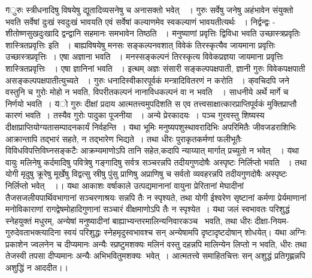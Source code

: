 {{{{\fontsize{14}{16}\selectfont \v    गुरुः स्त्रीधनादिषु विषयेषु द्यूतादिव्यसनेषु च अनासक्तो भवेत्~~।  गुरुः सर्वेषु जनेषु अहंभावेन संयुक्तो भवति सर्वेषां दुःखं स्वदुःखं भावयति एवं सर्वेषां कल्याणमेव स्वकल्याणं भावयतीत्यर्थः ~। निर्द्वन्द्वः - शीतोष्णसुखदुःखादि द्वन्द्वानि सहमानः समभावेन तिष्ठति ~।}
  {\fontsize{14}{16}\selectfont \v  मनुष्याणां प्रवृत्तिः द्विविधा भवति उच्छास्त्रप्रवृतिः शास्त्रितप्रवृत्तिः इति ~। बाह्यविषयेषु  मनसः सङ्कल्पनवशात्  विवेकं  तिरस्कृत्यैव जायमाना प्रवृत्तिः उच्छास्त्रप्रवृत्तिः~। एषा अज्ञाना भवति ~।   मनस्सङ्कल्पनं तिरस्कृत्य विवेकप्रज्ञया जायमाना प्रवृत्तिः शास्त्रितप्रवृत्तिः ~। एषा ज्ञानिनां भवति ~। इत्थम् अज्ञः संसारी सङ्कल्पपक्षपाती, ज्ञानी गुरुः विवेकपक्षपाती असङ्कल्पपक्षपातीत्युच्यते ~। गुरुः धनादिस्वीकारपूर्वकं मन्त्रादिवितरणं न करोति ~।}
{\fontsize{14}{16}\selectfont \v    क्वचिदपि जने वस्तुनि च गुरोः मोहो न भवति, विपरीतकल्पनं नानाविधकल्पनं वा न भवति~~। साधनीये अर्थे मार्गे च निर्णयो भवति~।}
{\fontsize{14}{16}\selectfont \v  यो गुरुः दीक्षां प्रदाय आत्मतत्त्वमुपदिशति स एव तत्त्वसाक्षात्कारप्राप्तिपूर्वकं मुक्तिप्राप्तौ कारणं भवति~। तस्यैव गुरोः पादुका पूजनीया ~। अन्ये प्रेरकादयः~। पञ्च गुरवस्तु शिष्यस्य दीक्षाप्राप्तियोग्यतासम्पादनकार्यं  निर्वहन्ति~। }  
{\fontsize{14}{16}\selectfont \v  यथा भूमिः मनुष्यपशुस्थावरादिभिः अपरिमितैः जीवजडराशिभिः आक्रान्तापि तद्भारं सहते, न तद्भारेण भिद्यते~। तथा धीरः पुराकृतकर्मणां फलीभूतैः विविधविपत्तिविघ्नसङ्कटैः आक्रम्यमाणोऽपि तानि सहेत,कदापि न्याय्यात् मार्गात् प्रच्युतो न भवेत्~~। }
{\fontsize{14}{16}\selectfont \v  यथा वायुः मलिनेषु कर्दमादिषु पवित्रेषु गङ्गादिषु सर्वत्र  सञ्चरन्नपि तदीयगुणदोषैः अस्पृष्टः निर्लिप्तो भवति ~। तथा योगी मृदुषु क्रूरेषु मूर्खेषु विद्वत्सु स्रीषु पुंसु प्राणिषु अप्राणिषु च  सर्वतो व्यवहरन्नपि तदीयगुणदोषैः अस्पृष्टः निर्लिप्तो भवेत्~~।।}
{\fontsize{14}{16}\selectfont \v  यथा आकाशः वर्षाकाले उत्पद्यमानानां वायुना प्रेरितानां मेघादीनां तैजसजलीयपार्थिवभागानां सञ्चरणाश्रयः सन्नपि तैः न स्पृश्यते, तथा योगी ईश्वरेण सृष्टानां कर्मणा प्रेर्यमाणानां मनोविकाराणां रागद्वेषमोहादिगुणानां सञ्चारं वीक्षमाणोऽपि तैः न स्पृश्येत~।}
{\fontsize{14}{16}\selectfont \v  यथा जलं स्वभावतः परिशुद्धं स्नेहयुक्तं मधुरम्, अन्येषां मनुष्यादीनां बाह्याभ्यन्तरमालिन्यनिवारकञ्च \footB \  भवति, तथा धीरः दीक्षा-नियम-गुरुदेवताभक्त्यादिना स्वयं परिशुद्धः स्नेहमृदुस्वभावश्च सन् अन्येषामपि दृष्टादृष्टदोषान् शोधयेत्। }   
{\fontsize{14}{16}\selectfont \v  यथा अग्निः प्रकाशेन ज्वलनेन च दीप्यमानः अन्यैः स्प्रष्टुमशक्यः मलिनं वस्तु दहन्नपि मालिन्येन लिप्तो न भवति, धीरः तथा तेजस्वी  तपसा दीप्यमानः अन्यैः अभिभवितुमशक्यः\footB \  भवेत्~। आत्मतत्त्वे समाहितचित्तः सन् अशुद्धं प्रतिगृह्णन्नपि अशुद्धिं न आददीत।।}
}}}
